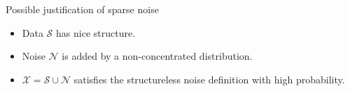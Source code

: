 \documentclass{beamer}
\newcommand{\mc}{\mathcal}
\begin{document}
\begin{frame}{Possible justification of sparse noise}
    \begin{itemize}
	  \item Data $\mc S$ has nice structure.
	  \item Noise $\mc N$ is added by a non-concentrated distribution.
	  \pause
	  \item $\mc X = \mc S \cup \mc N$ satisfies the structureless noise definition with high probability.
    \end{itemize}
\end{frame}

\end{document}

